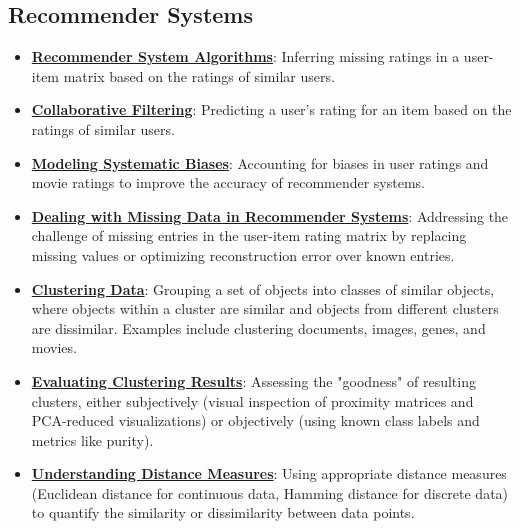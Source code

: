 \documentclass{article}%
\begin{document}
%
\subsection{Recommender Systems}%
\label{subsec:RecommenderSystems}%
\begin{itemize}[leftmargin=*]%
\item \href{https://www.math.purdue.edu/~yipn/351/11L2-svd-pca-recommender.pdf#page=31}{\textbf{Recommender System Algorithms}}: Inferring missing ratings in a user-item matrix based on the ratings of similar users.%
\item \href{https://www.math.purdue.edu/~yipn/351/11L2-svd-pca-recommender.pdf#page=33}{\textbf{Collaborative Filtering}}: Predicting a user's rating for an item based on the ratings of similar users.%
\item \href{https://www.math.purdue.edu/~yipn/351/11L2-svd-pca-recommender.pdf#page=40}{\textbf{Modeling Systematic Biases}}: Accounting for biases in user ratings and movie ratings to improve the accuracy of recommender systems.%
\item \href{https://www.math.purdue.edu/~yipn/351/11L2-svd-pca-recommender.pdf#page=39}{\textbf{Dealing with Missing Data in Recommender Systems}}: Addressing the challenge of missing entries in the user-item rating matrix by replacing missing values or optimizing reconstruction error over known entries.%
\item \href{https://www.math.purdue.edu/~yipn/351/12L2-distance-clusters.pdf#page=4}{\textbf{Clustering Data}}: Grouping a set of objects into classes of similar objects, where objects within a cluster are similar and objects from different clusters are dissimilar. Examples include clustering documents, images, genes, and movies.%
\item \href{https://www.math.purdue.edu/~yipn/351/12L2-distance-clusters.pdf#page=32}{\textbf{Evaluating Clustering Results}}: Assessing the "goodness" of resulting clusters, either subjectively (visual inspection of proximity matrices and PCA-reduced visualizations) or objectively (using known class labels and metrics like purity).%
\item \href{https://www.math.purdue.edu/~yipn/351/12L2-distance-clusters.pdf#page=17}{\textbf{Understanding Distance Measures}}: Using appropriate distance measures (Euclidean distance for continuous data, Hamming distance for discrete data) to quantify the similarity or dissimilarity between data points.%
\end{itemize}
\end{document}
